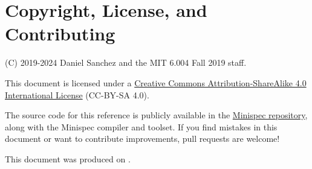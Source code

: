 \section{Copyright, License, and Contributing}

(C) 2019-2024 Daniel Sanchez and the MIT 6.004 Fall 2019 staff.

This document is licensed under a \href{http://creativecommons.org/licenses/by-sa/4.0/}{Creative Commons Attribution-ShareAlike 4.0 International License} (CC-BY-SA 4.0).

The source code for this reference is publicly available in the \href{https://github.com/minispec-hdl/minispec/}{Minispec repository},
along with the Minispec compiler and toolset.
If you find mistakes in this document or want to contribute improvements, pull requests are welcome!

This document was produced on .
